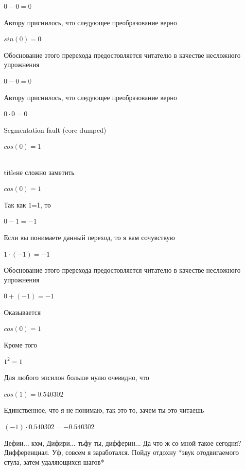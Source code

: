 \documentclass[12pt,a4paper,fleqn]{article}
\begin{document}
\begin{center}$0-0 = 0$\end{center}
Автору приснилось, что следующее преобразование верно

\begin{center}$sin(0) = 0$\end{center}
Обоснование этого пререхода предостовляется читателю в качестве несложного упрожнения

\begin{center}$0-0 = 0$\end{center}
Автору приснилось, что следующее преобразование верно

\begin{center}$0 \cdot 0 = 0$\end{center}
Segmentation fault (core dumped)

\begin{center}$cos(0) = 1$\end{center}
\\ title{не сложно заметить} 

\begin{center}$cos(0) = 1$\end{center}
Так как 1=1, то\cite{link4}

\begin{center}$0-1 = -1$\end{center}
Если вы понимаете данный переход, то я вам сочувствую

\begin{center}$1 \cdot (-1) = -1$\end{center}
Обоснование этого пререхода предостовляется читателю в качестве несложного упрожнения

\begin{center}$0+(-1) = -1$\end{center}
Оказывается

\begin{center}$cos(0) = 1$\end{center}
Кроме того

\begin{center}$1^{2} = 1$\end{center}
Для любого эпсилон больше нулю очевидно, что

\begin{center}$cos(1) = 0.540302$\end{center}
Единственное, что я не понимаю, так это то, зачем ты это читаешь

\begin{center}$(-1) \cdot 0.540302 = -0.540302$\end{center}
Дефии... кхм, Дифири... тьфу ты, дифферин... Да что ж со мной такое сегодня? Дифференциал. Уф, совсем я заработался. Пойду отдохну *звук отодвигаемого стула, затем удаляющихся шагов*
\end{document}
